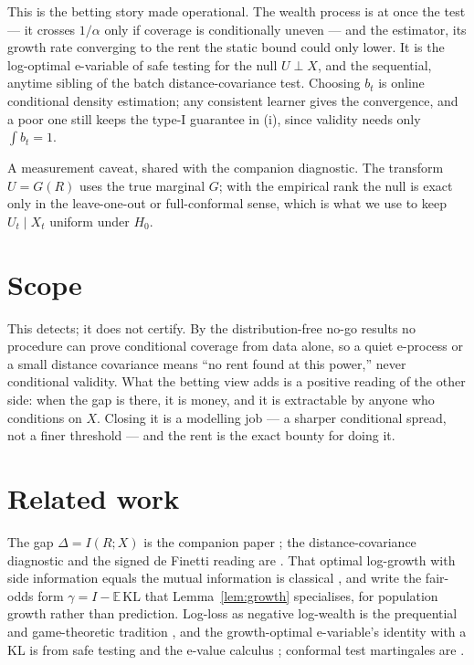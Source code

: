 \documentclass[11pt]{article}
\begin{document}
This is the betting story made operational. The wealth process is at once the test --- it crosses
$1/\alpha$ only if coverage is conditionally uneven --- and the estimator, its growth rate
converging to the rent the static bound could only lower. It is the log-optimal e-variable of safe
testing \citep{gruenwald2024,vovkwang2021} for the null $U\perp X$, and the sequential, anytime
sibling of the batch distance-covariance test. Choosing $b_t$ is online conditional density
estimation; any consistent learner gives the convergence, and a poor one still keeps the type-I
guarantee in (i), since validity needs only $\int b_t=1$.

A measurement caveat, shared with the companion diagnostic. The transform $U=G(R)$ uses the true
marginal $G$; with the empirical rank the null is exact only in the leave-one-out or full-conformal
sense, which is what we use to keep $U_t\mid X_t$ uniform under $H_0$.

\section{Scope}

This detects; it does not certify. By the distribution-free no-go results
\citep{leiwasserman2014,foygelbarber2021,vovk2012} no procedure can prove conditional coverage from
data alone, so a quiet e-process or a small distance covariance means ``no rent found at this
power,'' never conditional validity. What the betting view adds is a positive reading of the other
side: when the gap is there, it is money, and it is extractable by anyone who conditions on $X$.
Closing it is a modelling job --- a sharper conditional spread, not a finer threshold --- and the
rent is the exact bounty for doing it.

\section{Related work}

The gap $\Delta=I(R;X)$ is the companion paper \citep{cotton_marginally}; the distance-covariance
diagnostic and the signed de Finetti reading are \citep{cotton_signed}. That optimal log-growth with
side information equals the mutual information is classical \citep{kelly1956,cover2006,
barroncover1988}, and \citet{kemp2022} write the fair-odds form $\gamma=I-\mathbb E\,\mathrm{KL}$
that Lemma~\ref{lem:growth} specialises, for population growth rather than prediction. Log-loss as
negative log-wealth is the prequential and game-theoretic tradition \citep{dawid1984,shafervovk2019},
and the growth-optimal e-variable's identity with a KL is from safe testing and the e-value calculus
\citep{gruenwald2024,vovkwang2021}; conformal test martingales are \citet{vng2003}.
\end{document}
